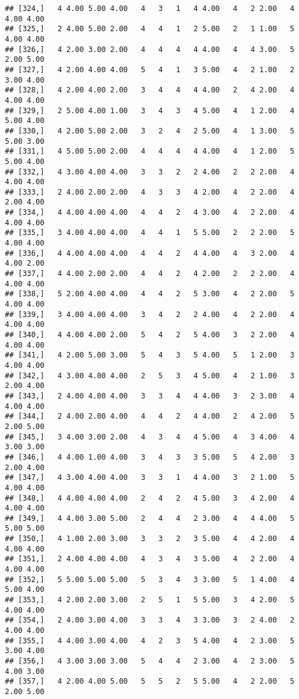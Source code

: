 \documentclass[]{article}
\begin{document}
\begin{verbatim}
## [324,]   4 4.00 5.00 4.00   4   3   1   4 4.00   4   2 2.00   4 4.00 4.00
## [325,]   2 4.00 5.00 2.00   4   4   1   2 5.00   2   1 1.00   5 4.00 4.00
## [326,]   4 2.00 3.00 2.00   4   4   4   4 4.00   4   4 3.00   5 2.00 5.00
## [327,]   4 2.00 4.00 4.00   5   4   1   3 5.00   4   2 1.00   2 3.00 4.00
## [328,]   4 2.00 4.00 2.00   3   4   4   4 4.00   2   4 2.00   4 4.00 4.00
## [329,]   2 5.00 4.00 1.00   3   4   3   4 5.00   4   1 2.00   4 5.00 4.00
## [330,]   4 2.00 5.00 2.00   3   2   4   2 5.00   4   1 3.00   5 5.00 3.00
## [331,]   4 5.00 5.00 2.00   4   4   4   4 4.00   4   1 2.00   5 5.00 4.00
## [332,]   4 3.00 4.00 4.00   3   3   2   2 4.00   2   2 2.00   4 4.00 4.00
## [333,]   2 4.00 2.00 2.00   4   3   3   4 2.00   4   2 2.00   4 2.00 4.00
## [334,]   4 4.00 4.00 4.00   4   4   2   4 3.00   4   2 2.00   4 4.00 4.00
## [335,]   3 4.00 4.00 4.00   4   4   1   5 5.00   2   2 2.00   5 4.00 4.00
## [336,]   4 4.00 4.00 4.00   4   4   2   4 4.00   4   3 2.00   4 4.00 2.00
## [337,]   4 4.00 2.00 2.00   4   4   2   4 2.00   2   2 2.00   4 4.00 4.00
## [338,]   5 2.00 4.00 4.00   4   4   2   5 3.00   4   2 2.00   5 4.00 4.00
## [339,]   3 4.00 4.00 4.00   3   4   2   2 4.00   4   2 2.00   4 4.00 4.00
## [340,]   4 4.00 4.00 2.00   5   4   2   5 4.00   3   2 2.00   4 4.00 4.00
## [341,]   4 2.00 5.00 3.00   5   4   3   5 4.00   5   1 2.00   3 4.00 4.00
## [342,]   4 3.00 4.00 4.00   2   5   3   4 5.00   4   2 1.00   3 2.00 4.00
## [343,]   2 4.00 4.00 4.00   3   3   4   4 4.00   3   2 3.00   4 4.00 4.00
## [344,]   2 4.00 2.00 4.00   4   4   2   4 4.00   2   4 2.00   5 2.00 5.00
## [345,]   3 4.00 3.00 2.00   4   3   4   4 5.00   4   3 4.00   4 3.00 3.00
## [346,]   4 4.00 1.00 4.00   3   4   3   3 5.00   5   4 2.00   3 2.00 4.00
## [347,]   4 3.00 4.00 4.00   3   3   1   4 4.00   3   2 1.00   5 4.00 4.00
## [348,]   4 4.00 4.00 4.00   2   4   2   4 5.00   3   4 2.00   4 4.00 4.00
## [349,]   4 4.00 3.00 5.00   2   4   4   2 3.00   4   4 4.00   5 5.00 5.00
## [350,]   4 1.00 2.00 3.00   3   3   2   3 5.00   4   4 2.00   4 4.00 4.00
## [351,]   2 4.00 4.00 4.00   4   3   4   3 5.00   4   2 2.00   4 4.00 4.00
## [352,]   5 5.00 5.00 5.00   5   3   4   3 3.00   5   1 4.00   4 5.00 4.00
## [353,]   4 2.00 2.00 3.00   2   5   1   5 5.00   3   4 2.00   5 4.00 4.00
## [354,]   2 4.00 3.00 4.00   3   3   4   3 3.00   3   2 4.00   2 4.00 4.00
## [355,]   4 4.00 3.00 4.00   4   2   3   5 4.00   4   2 3.00   5 3.00 4.00
## [356,]   4 3.00 3.00 3.00   5   4   4   2 3.00   4   2 3.00   5 4.00 3.00
## [357,]   4 2.00 4.00 5.00   5   5   2   5 5.00   4   2 2.00   5 2.00 5.00

\end{verbatim}
\end{document}
